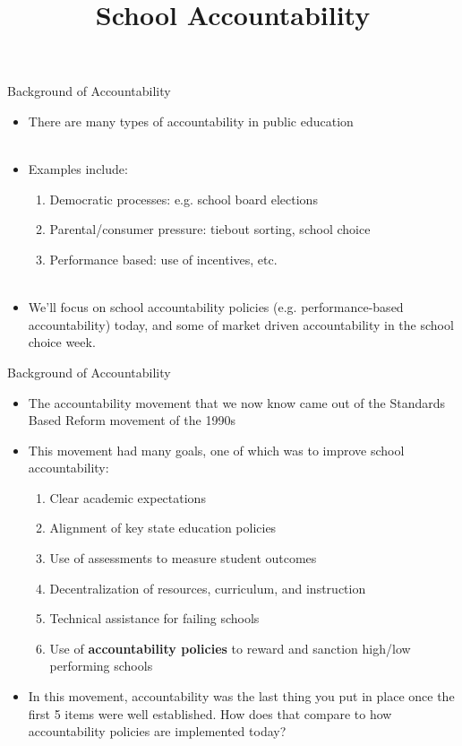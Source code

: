 \documentclass{beamer}
\title{School Accountability}
\begin{document}
\maketitle

\begin{frame}[<+->]{Background of Accountability}
	\begin{itemize}
		\item There are many types of accountability in public education \\~\\
		\item Examples include:
			\begin{enumerate}
				\item Democratic processes: e.g. school board elections
				\item Parental/consumer pressure: tiebout sorting, school choice
				\item Performance based: use of incentives, etc.   \\~\\
			\end{enumerate}
		\item We'll focus on school accountability policies (e.g. performance-based accountability) today, and some of market driven accountability in the school choice week. 
	\end{itemize}
\end{frame}		


\begin{frame}[<+->]{Background of Accountability}
	\begin{itemize}
		\item The accountability movement that we now know came out of the Standards Based Reform movement of the 1990s
		\item This movement had many goals, one of which was to improve school accountability:
			\begin{enumerate}
				\item Clear academic expectations
				\item Alignment of key state education policies
				\item Use of assessments to measure student outcomes
				\item Decentralization of resources, curriculum, and instruction
				\item Technical assistance for failing schools 
				\item Use of \textbf{accountability policies} to reward and sanction high/low performing schools
			\end{enumerate}
		\item In this movement, accountability was the last thing you put in place once the first 5 items were well established. How does that compare to how accountability policies are implemented today?
	\end{itemize}
\end{frame}
\end{document}
